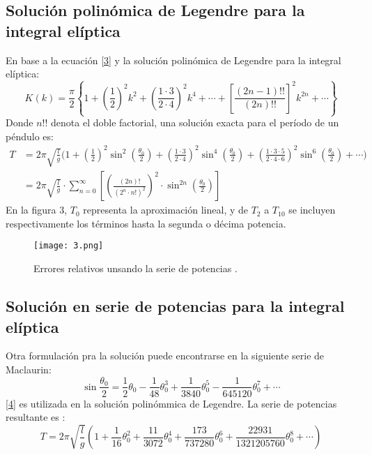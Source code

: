 \documentclass[12pt]{article}
\begin{document}
\subsection{Solución polinómica de Legendre para la integral elíptica}
En base a la ecuación \eqref{3} y la solución polinómica de Legendre para la integral elíptica:
\begin{equation*}
K(k)=\frac{\pi}{2}\left\{1+\left(\frac{1}{2}\right)^2k^2+\left(\frac{1\cdot3}{2\cdot4}\right)^2k^4+\cdots+\left[\frac{(2n-1)!!}{(2n)!!}\right]^2k^{2n}+\cdots\right\}
\end{equation*}
Donde $n!!$ denota el doble factorial, una solución exacta para el período de un péndulo es:
\begin{align*}
T&=2\pi\sqrt{\frac{l}{g}}\Bigg(1+\left(\frac{1}{2}\right)^2\sin^2\left(\frac{\theta_0}{2}\right)+\left(\frac{1\cdot3}{2\cdot4}\right)^2\sin^4\left(\frac{\theta_0}{2}\right)+\left(\frac{1\cdot3\cdot5}{2\cdot4\cdot6}\right)^2\sin^6\left(\frac{\theta_0}{2}\right)+\cdots\Bigg) \\
&=2\pi\sqrt{\frac{l}{g}}\cdot\sum_{n=0}^{\infty}\left[\left(\frac{(2n)!}{(2^n\cdot n!)^2}\right)^2\cdot\sin^{2n}\left(\frac{\theta_0}{2}\right)\right]
\end{align*}
En la figura 3, $T_0$ representa la aproximación lineal, y de $T_2$ a $T_{10}$ se incluyen respectivamente los términos hasta la segunda o décima potencia.

\begin{figure}[H]
\centering
\texttt{[image: 3.png]}
\caption{Errores relativos unsando la serie de potencias \cite{3}.}
\end{figure}


\subsection{Solución en serie de potencias para la integral elíptica}
Otra formulación pra la solución puede encontrarse en la siguiente serie de Maclaurin:
\begin{equation} \label{4}
\sin{\frac{\theta_0}{2}}=\frac{1}{2}\theta_0-\frac{1}{48}\theta_0^3+\frac{1}{3840}\theta_0^5-\frac{1}{645120}\theta_0^7+\cdots
\end{equation}
\eqref{4} es utilizada en la solución polinómmica de Legendre. La serie de potencias resultante es \cite{4}:
\begin{equation}
T=2\pi\sqrt{\frac{l}{g}}\left(1+\frac{1}{16}\theta_0^2+\frac{11}{3072}\theta_0^4+\frac{173}{737280}\theta_0^6+\frac{22931}{1321205760}\theta_0^8+\cdots\right)
\end{equation}
\end{document}
